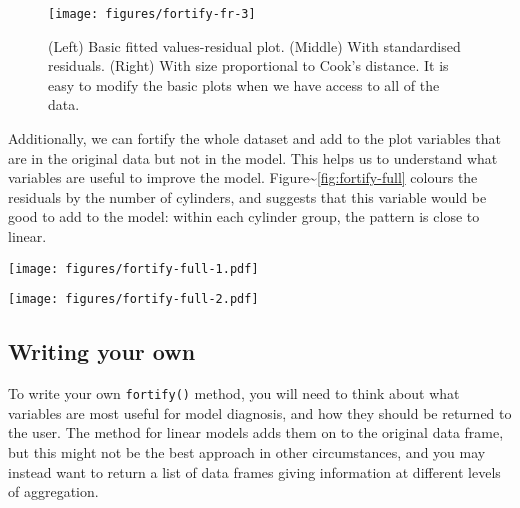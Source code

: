 \begin{figure}
\texttt{[image: figures/fortify-fr-3]} \caption{(Left) Basic fitted values-residual plot. (Middle) With standardised residuals. (Right) With size proportional to Cook's distance. It is easy to modify the basic plots when we have access to all of the data.\label{fig:fortify-fr3}}
\end{figure}

Additionally, we can fortify the whole dataset and add to the plot
variables that are in the original data but not in the model. This helps
us to understand what variables are useful to improve the model.
Figure\textasciitilde{}\ref{fig:fortify-full} colours the residuals by
the number of cylinders, and suggests that this variable would be good
to add to the model: within each cylinder group, the pattern is close to
linear.

\begin{Shaded}
\end{Shaded}

\texttt{[image: figures/fortify-full-1.pdf]}

\begin{Shaded}
\begin{Highlighting}[]
\StringTok{ } 
\end{Highlighting}
\end{Shaded}

\texttt{[image: figures/fortify-full-2.pdf]}

\subsection{Writing your own}

To write your own \texttt{fortify()} method, you will need to think
about what variables are most useful for model diagnosis, and how they
should be returned to the user. The method for linear models adds them
on to the original data frame, but this might not be the best approach
in other circumstances, and you may instead want to return a list of
data frames giving information at different levels of aggregation.

